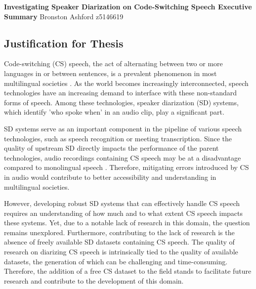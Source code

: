 \documentclass[11pt, a4paper]{report}
\begin{document}
\begin{center}
    \large\textbf{\textcolor{unswred2}{Investigating Speaker Diarization on Code-Switching 
    Speech Executive Summary}}
    {\textcolor{unswred2}{Bronston Ashford z5146619}}
  \end{center}


\subsection*{Justification for Thesis}

Code-switching (CS) speech, the act of alternating between two or more languages 
in or between sentences, is a prevalent phenomenon in  most multilingual societies 
\cite[2]{sitaramSurveyCodeswitchedSpeech2020}. 
As the world becomes increasingly interconnected, speech technologies have an 
increasing demand to interface with these non-standard forms of speech. Among these 
technologies, speaker diarization (SD) systems, which identify 'who spoke when' 
in an audio clip, play a significant part.

\vspace*{10pt}
SD systems serve as an important component in the pipeline of various speech 
technologies, such as speech recognition or meeting transcription. Since the 
quality of upstream SD directly impacts the performance of the parent technologies, 
audio recordings containing CS speech may be at a disadvantage compared to monolingual 
speech \cite[20]{parkReviewSpeakerDiarization2021}. Therefore, mitigating errors 
introduced by CS in audio would contribute to  better accessibility and understanding 
in multilingual societies.

\vspace*{10pt}

However, developing robust SD systems that can effectively handle CS speech 
requires an understanding of how much and to what extent CS speech impacts these 
systems. Yet, due to a notable lack of research in this domain, the question 
remains unexplored. Furthermore, contributing to the lack of research is the absence of freely available 
SD datasets containing CS speech. The quality of research on diarizing CS speech 
is intrinsically tied to the quality of available datasets, the generation of 
which can be challenging and time-consuming. Therefore, the addition of a free 
CS dataset to the field stands to facilitate future research and contribute to 
the development of this domain. 
\end{document}
